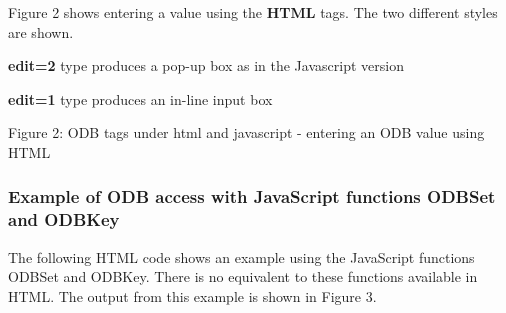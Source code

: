 Figure 2 shows entering a value using the {\bfseries HTML} tags. The two different styles are shown.
\begin{DoxyItemize}
\item {\bfseries edit=2} type produces a pop-\/up box as in the Javascript version
\item {\bfseries edit=1} type produces an in-\/line input box
\end{DoxyItemize}

\par
\par
\par
 \begin{center} Figure 2: ODB tags under html and javascript -\/ entering an ODB value using HTML \par
\par
\par
  \par
\par
\par
 \end{center} \hypertarget{RC_mhttpd_custom_ODB_access_examples_RC_mhttpd_js_example2}{}\subsubsection{Example of ODB access with JavaScript functions ODBSet and ODBKey}\label{RC_mhttpd_custom_ODB_access_examples_RC_mhttpd_js_example2}
The following HTML code shows an example using the JavaScript functions ODBSet and ODBKey. There is no equivalent to these functions available in HTML. The output from this example is shown in Figure 3.


